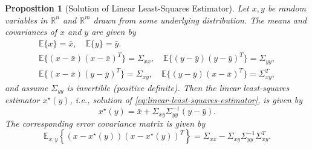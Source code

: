 \documentclass[
]{book}
\newtheorem{proposition}{Proposition}[chapter]
\theoremstyle{definition}
\theoremstyle{definition}
\theoremstyle{definition}
\theoremstyle{definition}
\theoremstyle{remark}
\begin{document}
\begin{proposition}[Solution of Linear Least-Squares Estimator]
\protect\hypertarget{prp:linear-least-squares-solution}{}\label{prp:linear-least-squares-solution}Let \(x,y\) be random variables in \(\mathbb{R}^n\) and \(\mathbb{R}^m\) drawn from some underlying distribution. The means and covariances of \(x\) and \(y\) are given by
\begin{equation}
\begin{split}
\mathbb{E}\{ x\} = \bar{x}, \quad \mathbb{E} \{ y \} = \bar{y}. \\
\mathbb{E}\{ (x - \bar{x})(x - \bar{x})^T \} = \Sigma_{xx}, \quad \mathbb{E}\{ (y - \bar{y})(y-\bar{y})^T \} = \Sigma_{yy}, \\
\mathbb{E}\{ (x - \bar{x})(y - \bar{y})^T \} = \Sigma_{xy}, \quad \mathbb{E}\{ (y - \bar{y})(x - \bar{x})^T \} = \Sigma^T_{xy},
\end{split}
\end{equation}
and assume \(\Sigma_{yy}\) is invertible (positive definite). Then the linear least-squares estimator \(x^\star(y)\), i.e., solution of \eqref{eq:linear-least-squares-estimator}, is given by
\begin{equation}
x^\star(y) = \bar{x} + \Sigma_{xy} \Sigma^{-1}_{yy} (y - \bar{y}).
\label{eq:linear-least-squares-solution}
\end{equation}
The corresponding error covariance matrix is given by
\begin{equation}
\mathbb{E}_{x,y} \left\{ (x - x^\star(y))(x - x^\star(y))^T \right\} = \Sigma_{xx} - \Sigma_{xy} \Sigma^{-1}_{yy} \Sigma^T_{xy}.
\label{eq:linear-least-squares-solution-covariance}
\end{equation}
\end{proposition}
\end{document}
